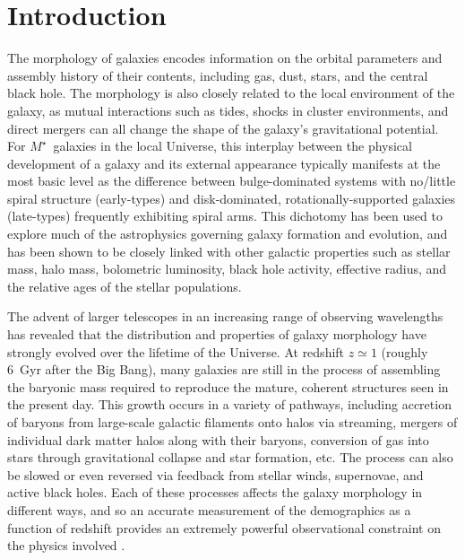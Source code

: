 \documentclass[twocolumn]{aastex6}
\begin{document}

\section{Introduction} \label{sec:intro}

The morphology of galaxies encodes information on the orbital parameters and
assembly history of their contents, including gas, dust, stars, and the central
black hole. The morphology is also closely related to the local environment of
the galaxy, as mutual interactions such as tides, shocks in cluster
environments, and direct mergers can all change the shape of the galaxy's
gravitational potential. For $M^\star$~galaxies in the local Universe, this
interplay between the physical development of a galaxy and its external
appearance typically manifests at the most basic level as the difference
between bulge-dominated systems with no/little spiral structure (early-types)
and disk-dominated, rotationally-supported galaxies (late-types) frequently
exhibiting spiral arms.  This dichotomy has been used to explore much of the
astrophysics governing galaxy formation and evolution, and has been shown to be
closely linked with other galactic properties such as stellar mass, halo mass,
bolometric luminosity, black hole activity, effective radius, and the relative
ages of the stellar populations.

The advent of larger telescopes in an increasing range of observing wavelengths
has revealed that the distribution and properties of galaxy morphology have
strongly evolved over the lifetime of the Universe. At redshift $z\simeq1$
(roughly 6~Gyr after the Big Bang), many galaxies are still in the process of
assembling the baryonic mass required to reproduce the mature, coherent
structures seen in the present day. This growth occurs in a variety of
pathways, including accretion of baryons from large-scale galactic filaments
onto halos via streaming, mergers of individual dark matter halos along with
their baryons, conversion of gas into stars through gravitational collapse and
star formation, etc. The process can also be slowed or even reversed via
feedback from stellar winds, supernovae, and active black holes.  Each of these
processes affects the galaxy morphology in different ways, and so an accurate
measurement of the demographics as a function of redshift provides an extremely
powerful observational constraint on the physics involved \citep[for recent
reviews see][]{but13,con14}. 
\end{document}
